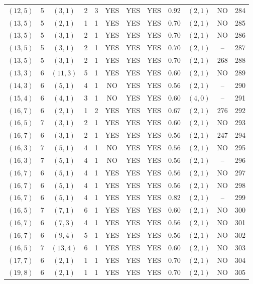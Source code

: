 \begin{longtable}{|c|c|c|c|c|c|c|c|c|c|c|c|}
$(12,5)$ & 5 & $(3,1)$ & 2 & 3 & YES & YES & YES & $0.92$ & $(2,1)$ & NO & 284\\
$(13,5)$ & 5 & $(2,1)$ & 1 & 1 & YES & YES & YES & $0.70$ & $(2,1)$ & NO & 285\\
$(13,5)$ & 5 & $(3,1)$ & 2 & 1 & YES & YES & YES & $0.70$ & $(2,1)$ & NO & 286\\
$(13,5)$ & 5 & $(3,1)$ & 2 & 1 & YES & YES & YES & $0.70$ & $(2,1)$ & -- & 287\\
$(13,5)$ & 5 & $(3,1)$ & 2 & 1 & YES & YES & YES & $0.70$ & $(2,1)$ & 268 & 288\\
$(13,3)$ & 6 & $(11,3)$ & 5 & 1 & YES & YES & YES & $0.60$ & $(2,1)$ & NO & 289\\
$(14,3)$ & 6 & $(5,1)$ & 4 & 1 & NO & YES & YES & $0.56$ & $(2,1)$ & -- & 290\\
$(15,4)$ & 6 & $(4,1)$ & 3 & 1 & NO & YES & YES & $0.60$ & $(4,0)$ & -- & 291\\
$(16,7)$ & 6 & $(2,1)$ & 1 & 2 & YES & YES & YES & $0.67$ & $(2,1)$ & 276 & 292\\
$(16,5)$ & 7 & $(3,1)$ & 2 & 1 & YES & YES & YES & $0.60$ & $(2,1)$ & NO & 293\\
$(16,7)$ & 6 & $(3,1)$ & 2 & 1 & YES & YES & YES & $0.56$ & $(2,1)$ & 247 & 294\\
$(16,3)$ & 7 & $(5,1)$ & 4 & 1 & NO & YES & YES & $0.56$ & $(2,1)$ & NO & 295\\
$(16,3)$ & 7 & $(5,1)$ & 4 & 1 & NO & YES & YES & $0.56$ & $(2,1)$ & -- & 296\\
$(16,7)$ & 6 & $(5,1)$ & 4 & 1 & YES & YES & YES & $0.56$ & $(2,1)$ & NO & 297\\
$(16,7)$ & 6 & $(5,1)$ & 4 & 1 & YES & YES & YES & $0.56$ & $(2,1)$ & NO & 298\\
$(16,7)$ & 6 & $(5,1)$ & 4 & 1 & YES & YES & YES & $0.82$ & $(2,1)$ & -- & 299\\
$(16,5)$ & 7 & $(7,1)$ & 6 & 1 & YES & YES & YES & $0.60$ & $(2,1)$ & NO & 300\\
$(16,7)$ & 6 & $(7,3)$ & 4 & 1 & YES & YES & YES & $0.56$ & $(2,1)$ & NO & 301\\
$(16,7)$ & 6 & $(9,4)$ & 5 & 1 & YES & YES & YES & $0.56$ & $(2,1)$ & NO & 302\\
$(16,5)$ & 7 & $(13,4)$ & 6 & 1 & YES & YES & YES & $0.60$ & $(2,1)$ & NO & 303\\
$(17,7)$ & 6 & $(2,1)$ & 1 & 1 & YES & YES & YES & $0.70$ & $(2,1)$ & NO & 304\\
$(19,8)$ & 6 & $(2,1)$ & 1 & 1 & YES & YES & YES & $0.70$ & $(2,1)$ & NO & 305\\

\end{longtable}
